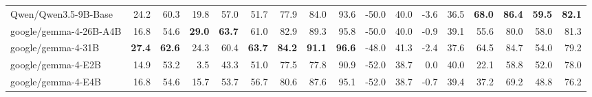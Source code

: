 \documentclass{article}
\begin{document}
\begin{table}[htbp]
\begin{threeparttable}
\begin{adjustbox}{max width=\textwidth}
\begin{tabular}{lrrrrrrrrrrrrrrrr}
Qwen/Qwen3.5-9B-Base & \cellcolor[HTML]{B7D9E9}24.2 & \cellcolor[HTML]{B4D7E8}60.3 & \cellcolor[HTML]{C7E1EE}19.8 & \cellcolor[HTML]{BFDDEB}57.0 & \cellcolor[HTML]{FAFCFD}51.7 & \cellcolor[HTML]{F4F9FB}77.9 & \cellcolor[HTML]{B4D7E8}84.0 & \cellcolor[HTML]{AED4E6}93.6 & \cellcolor[HTML]{FAD8C9}-50.0 & \cellcolor[HTML]{FAD9CA}40.0 & \cellcolor[HTML]{F4A582}-3.6 & \cellcolor[HTML]{F4A582}36.5 & \cellcolor[HTML]{92C5DE}\textbf{68.0} & \cellcolor[HTML]{92C5DE}\textbf{86.4} & \cellcolor[HTML]{92C5DE}\textbf{59.5} & \cellcolor[HTML]{92C5DE}\textbf{82.1} \\
google/gemma-4-26B-A4B & \cellcolor[HTML]{FDF1EC}16.8 & \cellcolor[HTML]{FDF5F2}54.6 & \cellcolor[HTML]{92C5DE}\textbf{29.0} & \cellcolor[HTML]{92C5DE}\textbf{63.7} & \cellcolor[HTML]{A9D1E5}61.0 & \cellcolor[HTML]{A6D0E4}82.9 & \cellcolor[HTML]{9AC9E0}89.3 & \cellcolor[HTML]{99C8E0}95.8 & \cellcolor[HTML]{FAD8C9}-50.0 & \cellcolor[HTML]{FAD9CA}40.0 & \cellcolor[HTML]{FDEFE9}-0.9 & \cellcolor[HTML]{FDF1EB}39.1 & \cellcolor[HTML]{BBDBEA}55.6 & \cellcolor[HTML]{B1D5E7}80.0 & \cellcolor[HTML]{96C7DF}58.0 & \cellcolor[HTML]{95C6DF}81.3 \\
google/gemma-4-31B & \cellcolor[HTML]{92C5DE}\textbf{27.4} & \cellcolor[HTML]{92C5DE}\textbf{62.6} & \cellcolor[HTML]{ADD3E6}24.3 & \cellcolor[HTML]{A8D0E4}60.4 & \cellcolor[HTML]{92C5DE}\textbf{63.7} & \cellcolor[HTML]{92C5DE}\textbf{84.2} & \cellcolor[HTML]{92C5DE}\textbf{91.1} & \cellcolor[HTML]{92C5DE}\textbf{96.6} & \cellcolor[HTML]{EFF6FA}-48.0 & \cellcolor[HTML]{EDF5F9}41.3 & \cellcolor[HTML]{F7C4AD}-2.4 & \cellcolor[HTML]{F7C5AE}37.6 & \cellcolor[HTML]{9DCBE1}64.5 & \cellcolor[HTML]{9AC9E0}84.7 & \cellcolor[HTML]{A3CEE3}54.0 & \cellcolor[HTML]{9ECBE1}79.2 \\
google/gemma-4-E2B & \cellcolor[HTML]{FBDFD3}14.9 & \cellcolor[HTML]{FBE3D9}53.2 & \cellcolor[HTML]{FBDED2}3.5 & \cellcolor[HTML]{FCE7DD}43.3 & \cellcolor[HTML]{FEFDFD}51.0 & \cellcolor[HTML]{FAFCFD}77.5 & \cellcolor[HTML]{D2E7F1}77.8 & \cellcolor[HTML]{C9E2EE}90.9 & \cellcolor[HTML]{F4A582}-52.0 & \cellcolor[HTML]{F4A582}38.7 & \cellcolor[HTML]{F3F9FB}0.0 & \cellcolor[HTML]{F1F7FA}40.0 & \cellcolor[HTML]{FADACC}22.1 & \cellcolor[HTML]{FCE7DE}58.8 & \cellcolor[HTML]{AAD1E5}52.0 & \cellcolor[HTML]{A3CEE3}78.0 \\
google/gemma-4-E4B & \cellcolor[HTML]{FDF1EC}16.8 & \cellcolor[HTML]{FDF5F2}54.6 & \cellcolor[HTML]{DFEEF5}15.7 & \cellcolor[HTML]{D5E8F2}53.7 & \cellcolor[HTML]{CFE5F0}56.7 & \cellcolor[HTML]{CAE2EE}80.6 & \cellcolor[HTML]{A3CEE3}87.6 & \cellcolor[HTML]{A0CCE2}95.1 & \cellcolor[HTML]{F4A582}-52.0 & \cellcolor[HTML]{F4A582}38.7 & \cellcolor[HTML]{FDF5F2}-0.7 & \cellcolor[HTML]{FEF7F4}39.4 & \cellcolor[HTML]{F8FBFD}37.2 & \cellcolor[HTML]{E7F2F7}69.2 & \cellcolor[HTML]{B4D7E8}48.8 & \cellcolor[HTML]{ABD2E5}76.2 \\

\end{tabular}
\end{adjustbox}
\end{threeparttable}
\end{table}
\end{document}
